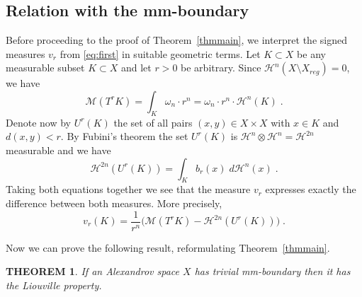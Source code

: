 \documentclass[12pt,leqno]{amsart}
\numberwithin{equation}{section}
\newtheorem{thm}{THEOREM}[section]
\theoremstyle{definition}
\theoremstyle{remark}
\newcommand{\tref}[1]{Theorem~\ref{#1}}
\begin{document}
\subsection{Relation with the mm-boundary}
Before proceeding to the proof of  \tref{thmmain}, we interpret the signed measures $v_r$ from \eqref{eq:first} in suitable geometric terms.
Let $K\subset X$ be   any measurable  subset $K\subset X$ and let $r>0$ be arbitrary.
Since $\mathcal H^n (X\setminus X_{reg} )=0$, we have
$$\mathcal M (T^r K) =\int _K \omega _n \cdot r^n  =\omega _n \cdot r^n \cdot \mathcal H^n (K) \; .$$
Denote now by $U^r(K)$ the set of all pairs $(x,y)\in X\times X$ with $x\in K$ and $d(x,y)<r$.
By Fubini's theorem the set $U^r(K)$ is $\mathcal H^n \otimes \mathcal H^n =\mathcal H^{2n}$ measurable and we have
$$\mathcal H^{2n} (U^r (K))= \int _K b_r (x) \;  d\mathcal H^n (x) \;. $$
Taking both equations  together we see that the measure $v_r$ expresses exactly the difference between both measures. More precisely,
\begin{equation} \label{eq:compare}
v_r (K) = \frac 1 {r^n} \Big(\mathcal M (T^r K)- \mathcal H^{2n} (U^r (K)) \Big)\;.
\end{equation}



Now we can prove the following result,  reformulating \tref{thmmain}.
\begin{thm} \label{reform}
If an Alexandrov space $X$ has trivial mm-boundary then  it has the Liouville property.
\end{thm}
\end{document}
